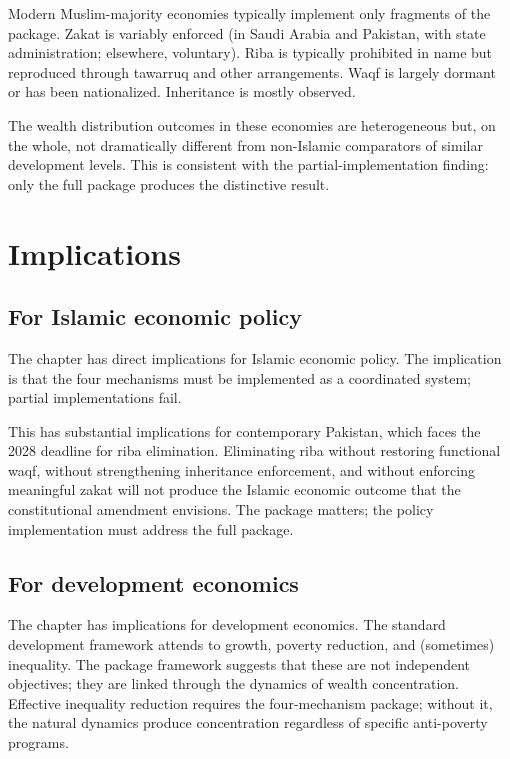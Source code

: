 Modern Muslim-majority economies typically implement only fragments
of the package. Zakat is variably enforced (in Saudi Arabia and
Pakistan, with state administration; elsewhere, voluntary). Riba
is typically prohibited in name but reproduced through tawarruq
and other arrangements. Waqf is largely dormant or has been
nationalized. Inheritance is mostly observed.

The wealth distribution outcomes in these economies are
heterogeneous but, on the whole, not dramatically different from
non-Islamic comparators of similar development levels. This is
consistent with the partial-implementation finding: only the full
package produces the distinctive result.

\section{Implications}
\label{sec:perm-implications}

\subsection{For Islamic economic policy}

The chapter has direct implications for Islamic economic policy.
The implication is that the four mechanisms must be implemented
as a coordinated system; partial implementations fail.

This has substantial implications for contemporary Pakistan, which
faces the 2028 deadline for riba elimination. Eliminating riba
without restoring functional waqf, without strengthening
inheritance enforcement, and without enforcing meaningful zakat
will not produce the Islamic economic outcome that the
constitutional amendment envisions. The package matters; the
policy implementation must address the full package.

\subsection{For development economics}

The chapter has implications for development economics. The
standard development framework attends to growth, poverty
reduction, and (sometimes) inequality. The package framework
suggests that these are not independent objectives; they are
linked through the dynamics of wealth concentration. Effective
inequality reduction requires the four-mechanism package; without
it, the natural dynamics produce concentration regardless of
specific anti-poverty programs.

